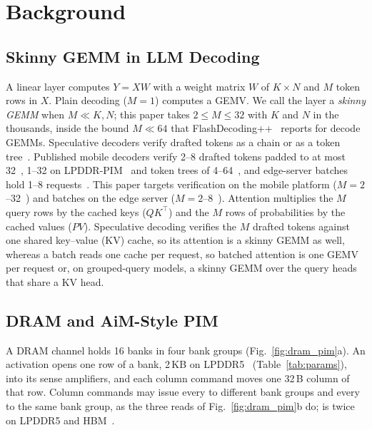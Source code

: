\section{Background}
\label{sec:bg}

\subsection{Skinny GEMM in LLM Decoding}
\label{sec:bg:skinny}

A linear layer computes $Y = X W$ with a weight matrix $W$ of $K \times N$ and $M$ token rows in $X$. Plain decoding
($M = 1$) computes a GEMV. We call the layer a \emph{skinny GEMM} when $M \ll K, N$; this paper takes $2 \le M \le 32$
with $K$ and $N$ in the thousands, inside the bound $M \ll 64$ that FlashDecoding++~\cite{flashdecodingpp} reports for
decode GEMMs. Speculative decoders verify drafted tokens as a chain or as a token tree~\cite{eagle2}.
Published mobile decoders verify 2--8 drafted tokens padded to at most 32~\cite{sdnpu}, 1--32 on LPDDR-PIM~\cite{lpspec}
and token trees of 4--64~\cite{lever}, and edge-server batches hold 1--8 requests~\cite{p3llm}. This
paper targets verification on the mobile platform ($M = 2$--32~\cite{sdnpu,lpspec}) and batches on the edge server
($M = 2$--8~\cite{p3llm}). Attention multiplies the $M$ query rows by the cached keys ($QK^\top$) and the $M$ rows of
probabilities by the cached values ($PV$). Speculative decoding verifies the $M$ drafted tokens against one shared
key--value (KV) cache, so its attention is a skinny GEMM as well, whereas a batch reads one cache per request, so batched attention
is one GEMV per request or, on grouped-query models, a skinny GEMM over the query heads that share a KV head.

\subsection{DRAM and AiM-Style PIM}
\label{sec:bg:pim}

A DRAM channel holds 16 banks in four bank groups (Fig.~\ref{fig:dram_pim}a). An activation opens one row of a bank,
2\,KB on LPDDR5~\cite{jedeclpddr5} (Table~\ref{tab:params}), into its sense amplifiers, and each column command moves
one 32\,B column of that row. Column commands may
issue every \tccds{} to different bank groups and every \tccdl{} to the same bank group, as the three reads of
Fig.~\ref{fig:dram_pim}b do; \tccdl{} is twice \tccds{} on LPDDR5 and HBM~\cite{ramulator2,p3llm}.

